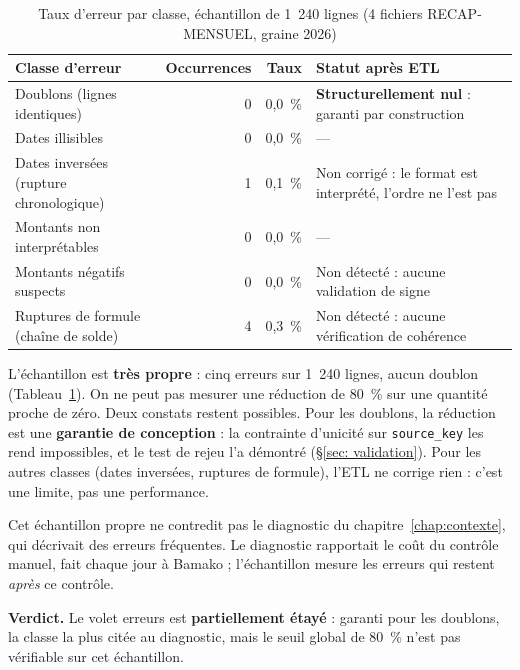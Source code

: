 \begin{table}[htbp]
\centering
\footnotesize
\caption{Taux d'erreur par classe, échantillon de 1~240 lignes (4 fichiers RECAP-MENSUEL, graine 2026)}
\label{tab:impact_erreurs}
\begin{tabular}{|>{\raggedright\arraybackslash}p{4.6cm}|r|r|>{\raggedright\arraybackslash}p{5.0cm}|}
\hline
\rowcolor[HTML]{EFEFEF}
\textbf{Classe d'erreur} & \textbf{Occurrences} & \textbf{Taux} & \textbf{Statut après ETL} \\ \hline
Doublons (lignes identiques) & 0 & 0,0~\% & \textbf{Structurellement nul} : garanti par construction \\ \hline
Dates illisibles & 0 & 0,0~\% & --- \\ \hline
Dates inversées (rupture chronologique) & 1 & 0,1~\% & Non corrigé : le format est interprété, l'ordre ne l'est pas \\ \hline
Montants non interprétables & 0 & 0,0~\% & --- \\ \hline
Montants négatifs suspects & 0 & 0,0~\% & Non détecté : aucune validation de signe \\ \hline
Ruptures de formule (chaîne de solde) & 4 & 0,3~\% & Non détecté : aucune vérification de cohérence \\ \hline
\end{tabular}
\end{table}

L'échantillon est \textbf{très propre} : cinq erreurs sur 1~240 lignes, aucun doublon (Tableau~\ref{tab:impact_erreurs}). On ne peut pas mesurer une réduction de 80~\% sur une quantité proche de zéro. Deux constats restent possibles. Pour les doublons, la réduction est une \textbf{garantie de conception} : la contrainte d'unicité sur \texttt{source\_key} les rend impossibles, et le test de rejeu l'a démontré (\S\ref{sec: validation}). Pour les autres classes (dates inversées, ruptures de formule), l'ETL ne corrige rien : c'est une limite, pas une performance.

Cet échantillon propre ne contredit pas le diagnostic du chapitre~\ref{chap:contexte}, qui décrivait des erreurs fréquentes. Le diagnostic rapportait le coût du contrôle manuel, fait chaque jour à Bamako ; l'échantillon mesure les erreurs qui restent \emph{après} ce contrôle.

\textbf{Verdict.} Le volet erreurs est \textbf{partiellement étayé} : garanti pour les doublons, la classe la plus citée au diagnostic, mais le seuil global de 80~\% n'est pas vérifiable sur cet échantillon.

